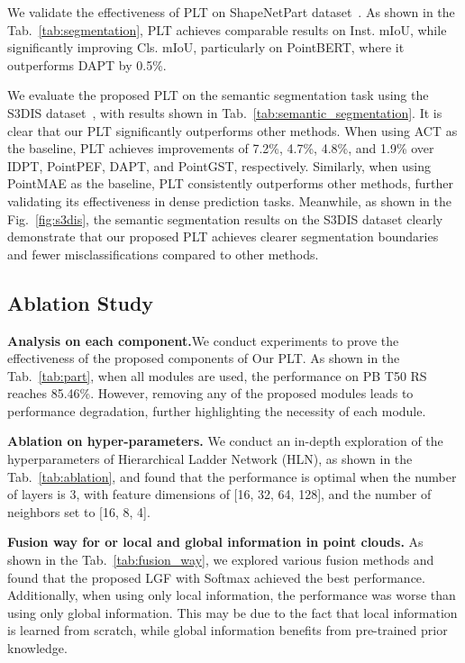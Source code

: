 We validate the effectiveness of PLT on ShapeNetPart dataset~\cite{yi2016scalable}. As shown in the Tab.~\ref{tab:segmentation}, PLT achieves comparable results on Inst. mIoU, while significantly improving Cls. mIoU, particularly on PointBERT, where it outperforms DAPT by 0.5\%.

We evaluate the proposed PLT on the semantic segmentation task using the S3DIS dataset~\cite{armeni20163d}, with results shown in Tab.~\ref{tab:semantic_segmentation}. It is clear that our PLT significantly outperforms other methods. When using ACT as the baseline, PLT achieves improvements of 7.2\%, 4.7\%, 4.8\%, and 1.9\% over IDPT, PointPEF, DAPT, and PointGST, respectively. Similarly, when using PointMAE as the baseline, PLT consistently outperforms other methods, further validating its effectiveness in dense prediction tasks. Meanwhile, as shown in the Fig.~\ref{fig:s3dis}, the semantic segmentation results on the S3DIS dataset clearly demonstrate that our proposed PLT achieves clearer segmentation boundaries and fewer misclassifications compared to other methods.











\subsection{Ablation Study}

\textbf{Analysis on each component.}We conduct experiments to prove the effectiveness of the proposed components of Our PLT. As shown in the Tab.~\ref{tab:part}, when all modules are used, the performance on PB T50 RS reaches 85.46\%. However, removing any of the proposed modules leads to performance degradation, further highlighting the necessity of each module.

\textbf{Ablation on hyper-parameters.} We conduct an in-depth exploration of the hyperparameters of Hierarchical Ladder Network (HLN), as shown in the Tab.~\ref{tab:ablation}, and found that the performance is optimal when the number of layers is 3, with feature dimensions of [16, 32, 64, 128], and the number of neighbors set to [16, 8, 4].

\textbf{Fusion way for or local and global information in point clouds.} As shown in the Tab.~\ref{tab:fusion_way}, we explored various fusion methods and found that the proposed LGF with Softmax achieved the best performance. Additionally, when using only local information, the performance was worse than using only global information. This may be due to the fact that local information is learned from scratch, while global information benefits from pre-trained prior knowledge.

